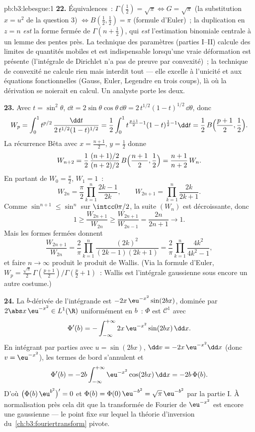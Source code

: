 \begin{solution}{pb:b3:lebesgue:1}
\textbf{22.} Équivalences~: $\Gamma(\frac12) = \sqrt\pi
\Leftrightarrow G = \sqrt\pi$ (la substitution $x = u^2$ de
la question 3) $\Leftrightarrow B(\frac12, \frac12) =
\pi$ (formule d'Euler)~; la duplication en $z = n$
\emph{est} la forme fermée de $\Gamma(n + \frac12)$, qui
\emph{est} l'estimation binomiale centrale à un lemme des
pentes près. La technique des paramètres (parties I--II)
calcule des limites de quantités mobiles et est
indispensable lorsqu'une vraie déformation est présente
(l'intégrale de Dirichlet n'a pas de preuve par
convexité)~; la technique de convexité ne calcule rien
mais interdit tout --- elle excelle à l'unicité et aux
équations fonctionnelles (Gauss, Euler, Legendre en trois
coups), là où la dérivation se noierait en calcul. Un
analyste  porte les deux.

\textbf{23.} Avec $t = \sin^2\theta$, $\dd t =
2\sin\theta\cos\theta\,\dd\theta =
2\,t^{1/2}(1-t)^{1/2}\,\dd\theta$, donc
\[
W_p = \int_0^1 t^{p/2}\,
\frac{\dd t}{2\,t^{1/2}(1-t)^{1/2}}
= \frac12\int_0^1 t^{\frac{p+1}2 - 1}(1-t)^{\frac12 - 1}\dd t
= \frac12\,B\Bigl(\frac{p+1}2, \frac12\Bigr).
\]
La récurrence Bêta avec $x = \frac{n+1}2$, $y = \frac12$
donne
\[
W_{n+2} = \frac12\,
\frac{(n+1)/2}{(n+2)/2}\,B\Bigl(\frac{n+1}2, \frac12\Bigr)
= \frac{n+1}{n+2}\,W_n .
\]
En partant de $W_0 = \frac\pi2$, $W_1 = 1$~:
\[
W_{2n} = \frac\pi2\prod_{k=1}^n\frac{2k-1}{2k},
\qquad
W_{2n+1} = \prod_{k=1}^n\frac{2k}{2k+1} .
\]
Comme $\sin^{n+1} \leq \sin^n$ sur $\intcc0{\pi/2}$, la
suite $(W_n)$ est décroissante, donc
\[
1 \geq \frac{W_{2n+1}}{W_{2n}} \geq
\frac{W_{2n+1}}{W_{2n-1}} = \frac{2n}{2n+1}
\longrightarrow 1 .
\]
Mais les formes fermées donnent
\[
\frac{W_{2n+1}}{W_{2n}} = \frac2\pi
\prod_{k=1}^n\frac{(2k)^2}{(2k-1)(2k+1)}
= \frac2\pi\prod_{k=1}^n\frac{4k^2}{4k^2-1},
\]
et faire $n \to \infty$ produit le produit de Wallis. (Via
la formule d'Euler, $W_p = \frac{\sqrt\pi}2\,
\Gamma(\frac{p+1}2)/\Gamma(\frac p2 + 1)$~: Wallis est
l'intégrale gaussienne sous encore un autre costume.)

\textbf{24.} La $b$-dérivée de l'intégrande est
$-2x\,\eu^{-x^2}\sin(2bx)$, dominée par $2\abs
x\,\eu^{-x^2} \in L^1(\R)$ uniformément en $b$~: $\Phi$
est $\mathcal C^1$ avec
\[
\Phi'(b) = -\int_{-\infty}^{+\infty}
2x\,\eu^{-x^2}\sin(2bx)\,\dd x .
\]
En intégrant par parties avec $u = \sin(2bx)$, $\dd v =
-2x\,\eu^{-x^2}\dd x$ (donc $v = \eu^{-x^2}$), les termes
de bord s'annulent et
\[
\Phi'(b) = -2b\int_{-\infty}^{+\infty}
\eu^{-x^2}\cos(2bx)\,\dd x = -2b\,\Phi(b).
\]
D'où $\bigl(\Phi(b)\,\eu^{b^2}\bigr)' = 0$ et $\Phi(b) =
\Phi(0)\,\eu^{-b^2} = \sqrt\pi\,\eu^{-b^2}$ par la partie
I. À normalisation près cela dit que la transformée de
Fourier de $\eu^{-x^2}$ est encore une gaussienne --- le
point fixe sur lequel la théorie d'inversion
du~\cref{ch:b3:fouriertransform} pivote.


\end{solution}
